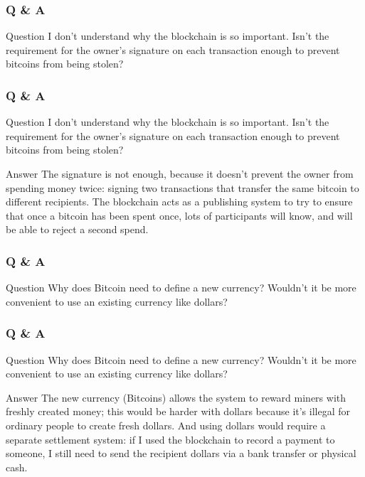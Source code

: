 \begin{frame}
    \frametitle{Q \& A}
    \begin{block}{Question}
I don't understand why the blockchain is so important. Isn't the
requirement for the owner's signature on each transaction enough to
prevent bitcoins from being stolen?
    \end{block}
\end{frame}

\begin{frame}
    \frametitle{Q \& A}
    \begin{block}{Question}
I don't understand why the blockchain is so important. Isn't the
requirement for the owner's signature on each transaction enough to
prevent bitcoins from being stolen?
    \end{block}

    \begin{block}{Answer}
The signature is not enough, because it doesn't prevent the owner
from spending money twice: signing two transactions that transfer the
same bitcoin to different recipients. The blockchain acts as a
publishing system to try to ensure that once a bitcoin has been spent
once, lots of participants will know, and will be able to reject a
second spend.
    \end{block}
\end{frame}

\begin{frame}
    \frametitle{Q \& A}
    \begin{block}{Question}
Why does Bitcoin need to define a new currency? Wouldn't it be more
convenient to use an existing currency like dollars?
    \end{block}
\end{frame}

\begin{frame}
    \frametitle{Q \& A}
    \begin{block}{Question}
Why does Bitcoin need to define a new currency? Wouldn't it be more
convenient to use an existing currency like dollars?
    \end{block}

    \begin{block}{Answer}
The new currency (Bitcoins) allows the system to reward miners with
freshly created money; this would be harder with dollars because it's
illegal for ordinary people to create fresh dollars. And using dollars
would require a separate settlement system: if I used the blockchain
to record a payment to someone, I still need to send the recipient
dollars via a bank transfer or physical cash.
    \end{block}
\end{frame}

